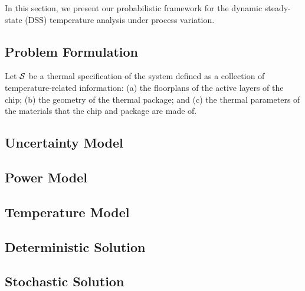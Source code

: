 In this section, we present our probabilistic framework for the dynamic steady-state (DSS) temperature analysis under process variation.

\subsection{Problem Formulation} 
Let $\mathcal{S}$ be a thermal specification of the system defined as a collection of temperature-related information: (a) the floorplans of the active layers of the chip; (b) the geometry of the thermal package; and (c) the thermal parameters of the materials that the chip and package are made of.

\subsection{Uncertainty Model} 


\subsection{Power Model} 


\subsection{Temperature Model} 


\subsection{Deterministic Solution} 


\subsection{Stochastic Solution} 

